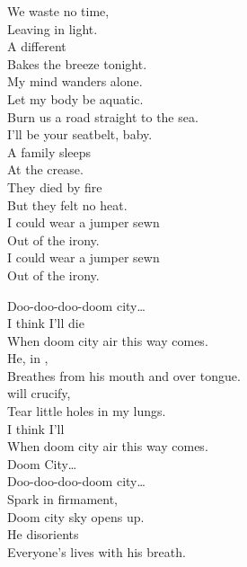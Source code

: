 We waste no time, \\
Leaving in light. \\
A different  \\
Bakes the breeze tonight. \\

My mind wanders alone. \\
Let my body be aquatic. \\

Burn us a road straight to the sea. \\
I'll be your seatbelt, baby. \\

A family sleeps \\
At the crease. \\
They died by fire \\
But they felt no heat. \\
I could wear a jumper sewn \\
Out of the irony. \\

I could wear a jumper sewn \\
Out of the irony. \\





Doo-doo-doo-doom city… \\

I think I'll die \\
When doom city air this way comes. \\
He, in , \\
Breathes from his mouth and over tongue. \\

 will crucify, \\
Tear little holes in my lungs. \\
I think I'll  \\
When doom city air this way comes. \\

Doom City… \\

Doo-doo-doo-doom city… \\

Spark in firmament, \\
Doom city sky opens up. \\
He disorients \\
Everyone's lives with his breath. \\

